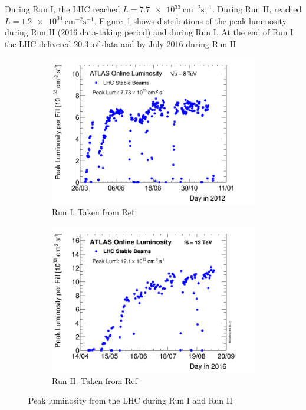 \par During Run I, the LHC reached $L = \num{7.7e33}\SI{}{\cm^{-2}\s^{-1}}$. During Run II, 
 reached $L = \num{1.2e34}\SI{}{\cm^{-2}\s^{-1}}$. Figure~\ref{fig:peakLumi} shows distributions 
of the peak luminosity during Run II (2016 data-taking period) and during Run I. 
At the end of Run I the LHC delivered 20.3~\ifb of data and by July 2016 during Run II 

\begin{figure}[!h]
\begin{subfigure}{0.5\textwidth}
   \includegraphics[width=\textwidth]{figures/peakLumiByFill2012.png}
	\caption{Run I. Taken from Ref~\cite{ATLAS:lumi2012}}
\end{subfigure} %
\begin{subfigure}{0.5\textwidth}
   \includegraphics[width=\textwidth]{figures/peakLumiByFill.png}
	\caption{Run II. Taken from Ref~\cite{ATLAS:lumi}}
\end{subfigure}
	\caption{Peak luminosity from the LHC during Run I and Run II}
\label{fig:peakLumi}
\end{figure}

